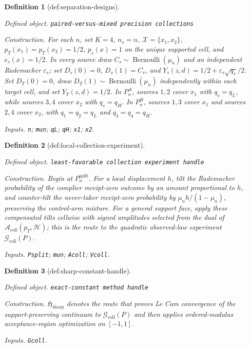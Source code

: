 \documentclass{article}
\newtheorem{definition}{Definition}
\begin{document}
\begin{definition}[def:separation-designs]\label{def:separation-designs}
\par\smallskip\noindent\emph{Defined object.} \texttt{paired-\allowbreak{}versus-\allowbreak{}mixed precision collections}
\par\smallskip\noindent\emph{Construction.} For each \(n\), set \(K=4\), \(n_s=n\), \(\mathcal X=\{x_1,x_2\}\), \(p_T(x_1)=p_T(x_2)=1/2\), \(p_s(x)=1\) on the unique supported cell, and \(e_s(x)=1/2\). In every source draw \(C_s\sim\operatorname{Bernoulli}(\mu_n)\) and an independent Rademacher \(\varepsilon_s\); set \(D_s(0)=0\), \(D_s(1)=C_s\), and \(Y_s(z,d)=1/2+\varepsilon_s\sqrt{q_s}/2\). Set \(D_T(0)=0\), draw \(D_T(1)\sim\operatorname{Bernoulli}(\mu_n)\) independently within each target cell, and set \(Y_T(z,d)=1/2\). In \(P_n^A\), sources \(1,2\) cover \(x_1\) with \(q_s=q_L\), while sources \(3,4\) cover \(x_2\) with \(q_s=q_H\). In \(P_n^B\), sources \(1,3\) cover \(x_1\) and sources \(2,4\) cover \(x_2\), with \(q_1=q_2=q_L\) and \(q_3=q_4=q_H\).
\par\smallskip\noindent\emph{Inputs.} \texttt{n}; \texttt{mun}; \texttt{qL}; \texttt{qH}; \texttt{x1}; \texttt{x2}.
\end{definition}

\begin{definition}[def:local-collection-experiment]\label{def:local-collection-experiment}
\par\smallskip\noindent\emph{Defined object.} \texttt{least-\allowbreak{}favorable collection experiment handle}
\par\smallskip\noindent\emph{Construction.} Begin at \(P_n^{\mathrm{split}}\). For a local displacement \(h\), tilt the Rademacher probability of the complier receipt-zero outcome by an amount proportional to \(h\), and counter-tilt the never-taker receipt-zero probability by \(\mu_nh/(1-\mu_n)\), preserving the control-arm mixture. For a general support face, apply these compensated tilts cellwise with signed amplitudes selected from the dual of \(\mathcal A_{\mathrm{coll}}(p_T,\mathcal H)\); this is the route to the quadratic observed-law experiment \(\mathcal G_{\mathrm{coll}}(P)\).
\par\smallskip\noindent\emph{Inputs.} \texttt{Psplit}; \texttt{mun}; \texttt{Acoll}; \texttt{Vcoll}.
\end{definition}

\begin{definition}[def:sharp-constant-handle]\label{def:sharp-constant-handle}
\par\smallskip\noindent\emph{Defined object.} \texttt{exact-\allowbreak{}constant method handle}
\par\smallskip\noindent\emph{Construction.} \(\mathfrak H_{\mathrm{sharp}}\) denotes the route that proves Le Cam convergence of the support-preserving continuum to \(\mathcal G_{\mathrm{coll}}(P)\) and then applies ordered-modulus acceptance-region optimization on \([-1,1]\).
\par\smallskip\noindent\emph{Inputs.} \texttt{Gcoll}.
\end{definition}
\end{document}
